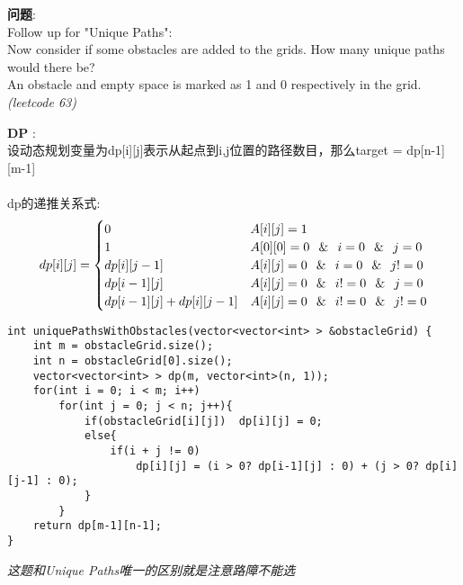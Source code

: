     
\begin{description}
    \item{\textbf{问题}}:\\
Follow up for "Unique Paths":\\
Now consider if some obstacles are added to the grids. How many unique paths would there be?\\
An obstacle and empty space is marked as 1 and 0 respectively in the grid.\textit{(leetcode 63)}
    \item{\textbf{DP}} : 
    \\设动态规划变量为dp[i][j]表示从起点到i,j位置的路径数目，那么target = dp[n-1][m-1]\\
	\\dp的递推关系式:
$$
dp[i][j] =
\begin{cases} 
0 & A[i][j] = 1 \\
1 & A[0][0] = 0 \,\And\, i = 0 \,\And\, j = 0 \\
dp[i][j-1] & A[i][j] = 0 \,\And\, i = 0 \,\And\, j != 0 \\
dp[i-1][j] & A[i][j] = 0 \,\And\, i != 0 \,\And\, j = 0 \\
dp[i-1][j]+dp[i][j-1] &  A[i][j] = 0 \,\And\, i != 0 \,\And\, j != 0
\end{cases}
$$
    \begin{lstlisting}
int uniquePathsWithObstacles(vector<vector<int> > &obstacleGrid) {
	int m = obstacleGrid.size();
	int n = obstacleGrid[0].size();
	vector<vector<int> > dp(m, vector<int>(n, 1));
	for(int i = 0; i < m; i++)
		for(int j = 0; j < n; j++){
			if(obstacleGrid[i][j])	dp[i][j] = 0;
			else{
				if(i + j != 0)
					dp[i][j] = (i > 0? dp[i-1][j] : 0) + (j > 0? dp[i][j-1] : 0);
			}
		}
	return dp[m-1][n-1];
}
    \end{lstlisting}
	\textit{这题和Unique Paths唯一的区别就是注意路障不能选}
\end{description}

